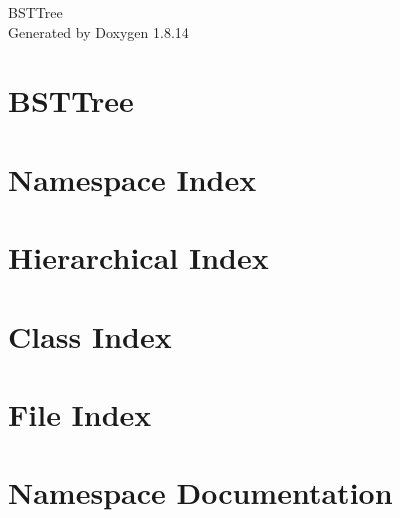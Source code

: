 \documentclass[twoside]{book}
\newcommand{\+}{\discretionary{\mbox{\scriptsize$\hookleftarrow$}}{}{}}
\newcommand{\clearemptydoublepage}{%
  \newpage{\pagestyle{empty}\cleardoublepage}%
}
\begin{document}
\hypersetup{pageanchor=false,
             bookmarksnumbered=true,
             pdfencoding=unicode
            }
\begin{titlepage}
\vspace*{7cm}
\begin{center}%
{\Large B\+S\+T\+Tree }\\
\vspace*{1cm}
{\large Generated by Doxygen 1.8.14}\\
\end{center}
\end{titlepage}
\clearemptydoublepage
{}
\tableofcontents
\clearemptydoublepage
{}
\hypersetup{pageanchor=true}

\chapter{B\+S\+T\+Tree}
\label{index}\hypertarget{index}{}
\chapter{Namespace Index}

\chapter{Hierarchical Index}

\chapter{Class Index}

\chapter{File Index}

\chapter{Namespace Documentation}









\end{document}
